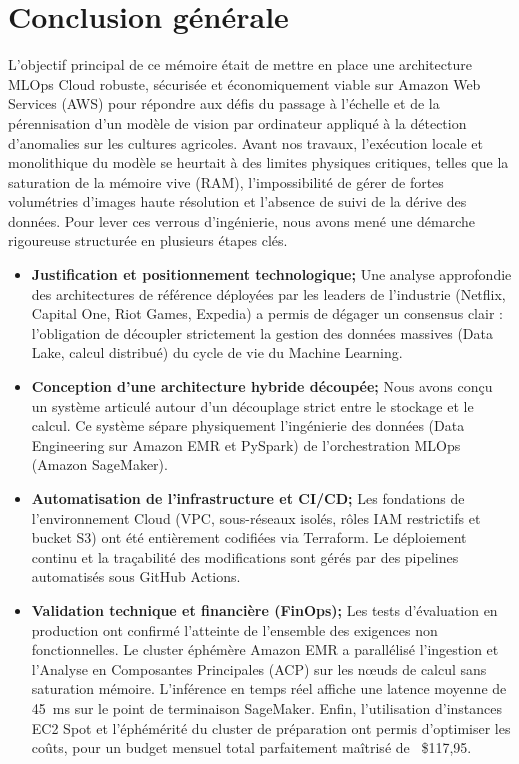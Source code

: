 \chapter*{Conclusion générale}
\label{chap:conclusion_generale}

L'objectif principal de ce mémoire était de mettre en place une architecture MLOps Cloud robuste, sécurisée et économiquement viable sur Amazon Web Services (AWS) pour répondre aux défis du passage à l'échelle et de la pérennisation d'un modèle de vision par ordinateur appliqué à la détection d'anomalies sur les cultures agricoles. Avant nos travaux, l'exécution locale et monolithique du modèle se heurtait à des limites physiques critiques, telles que la saturation de la mémoire vive (RAM), l'impossibilité de gérer de fortes volumétries d'images haute résolution et l'absence de suivi de la dérive des données. Pour lever ces verrous d'ingénierie, nous avons mené une démarche rigoureuse structurée en plusieurs étapes clés.

\begin{itemize}
    \item[$\bullet$] \textbf{Justification et positionnement technologique;} Une analyse approfondie des architectures de référence déployées par les leaders de l'industrie (Netflix, Capital One, Riot Games, Expedia) a permis de dégager un consensus clair : l'obligation de découpler strictement la gestion des données massives (Data Lake, calcul distribué) du cycle de vie du Machine Learning.
    \item[$\bullet$] \textbf{Conception d'une architecture hybride découpée;} Nous avons conçu un système articulé autour d'un découplage strict entre le stockage et le calcul. Ce système sépare physiquement l'ingénierie des données (Data Engineering sur Amazon EMR et PySpark) de l'orchestration MLOps (Amazon SageMaker).
    \item[$\bullet$] \textbf{Automatisation de l'infrastructure et CI/CD;} Les fondations de l'environnement Cloud (VPC, sous-réseaux isolés, rôles IAM restrictifs et bucket S3) ont été entièrement codifiées via Terraform. Le déploiement continu et la traçabilité des modifications sont gérés par des pipelines automatisés sous GitHub Actions.
    \item[$\bullet$] \textbf{Validation technique et financière (FinOps);} Les tests d'évaluation en production ont confirmé l'atteinte de l'ensemble des exigences non fonctionnelles. Le cluster éphémère Amazon EMR a parallélisé l'ingestion et l'Analyse en Composantes Principales (ACP) sur les nœuds de calcul sans saturation mémoire. L'inférence en temps réel affiche une latence moyenne de 45~ms sur le point de terminaison SageMaker. Enfin, l'utilisation d'instances EC2 Spot et l'éphémérité du cluster de préparation ont permis d'optimiser les coûts, pour un budget mensuel total parfaitement maîtrisé de ~\$117,95.
\end{itemize}



